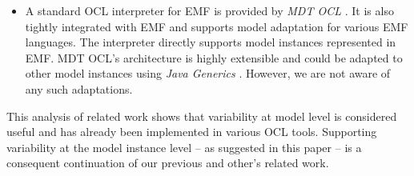 \begin{itemize}
\item A standard OCL interpreter for EMF is provided by \emph{MDT OCL}
\cite{WWW:MDT}. It is also tightly integrated with EMF and supports 
model adaptation for various EMF languages. The interpreter directly supports
model instances represented in EMF. MDT OCL's architecture is highly extensible
and could be adapted to other model instances using \emph{Java Generics} \cite{damus:EclipseCon08}. 
However, we are not aware of any such adaptations.

\end{itemize}

This analysis of related work shows that variability at model level is
considered useful and has already been implemented in various OCL tools.
Supporting variability at the model instance level -- as suggested in this paper --  
is a consequent continuation of our previous and other's related work.